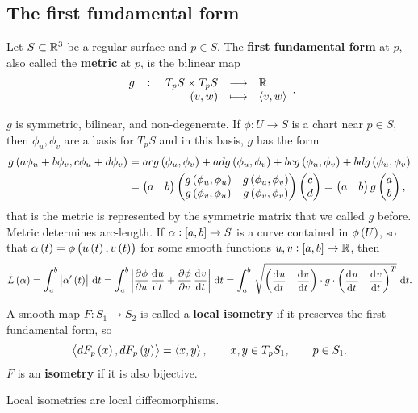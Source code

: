 \pagebreak

\subsection{The first fundamental form}

\begin{definition}
Let $ S \subset \mathbb{R}^3 $ be a regular surface and $ p \in S $. The \textbf{first fundamental form} at $ p $, also called the \textbf{metric} at $ p $, is the bilinear map
$$ \function[g]{T_pS \times T_pS}{\R}{\br{v, w}}{\abr{v, w}}. $$
\end{definition}

$ g $ is symmetric, bilinear, and non-degenerate. If $ \phi : U \to S $ is a chart near $ p \in S $, then $ \phi_u, \phi_v $ are a basis for $ T_pS $ and in this basis, $ g $ has the form
\begin{align*}
g\br{a\phi_u + b\phi_v, c\phi_u + d\phi_v}
& = acg\br{\phi_u, \phi_v} + adg\br{\phi_u, \phi_v} + bcg\br{\phi_u, \phi_v} + bdg\br{\phi_u, \phi_v} \\
& = \onebytwo{a}{b}\twobytwo{g\br{\phi_u, \phi_u}}{g\br{\phi_u, \phi_v}}{g\br{\phi_v, \phi_u}}{g\br{\phi_v, \phi_v}}\twobyone{c}{d}
= \onebytwo{a}{b}g\twobyone{a}{b},
\end{align*}
that is the metric is represented by the symmetric matrix that we called $ g $ before. Metric determines arc-length. If $ \alpha : \sbr{a, b} \to S $ is a curve contained in $ \phi\br{U} $, so that $ \alpha\br{t} = \phi\br{u\br{t}, v\br{t}} $ for some smooth functions $ u, v : \sbr{a, b} \to \R $, then
$$ L\br{\alpha} = \intd{a}{b}{\abs{\alpha'\br{t}}}{t} = \intd{a}{b}{\abs{\dpd{\phi}{u}\dod{u}{t} + \dpd{\phi}{v}\dod{v}{t}}}{t} = \intd{a}{b}{\sqrt{\onebytwo{\dod{u}{t}}{\dod{v}{t}} \cdot g \cdot \onebytwo{\dod{u}{t}}{\dod{v}{t}}^T}}{t}. $$

\begin{definition}
A smooth map $ F : S_1 \to S_2 $ is called a \textbf{local isometry} if it preserves the first fundamental form, so
$$ \abr{dF_p\br{x}, dF_p\br{y}} = \abr{x, y}, \qquad x, y \in T_pS_1, \qquad p \in S_1. $$
$ F $ is an \textbf{isometry} if it is also bijective.
\end{definition}

\begin{proposition}
Local isometries are local diffeomorphisms.
\end{proposition}


